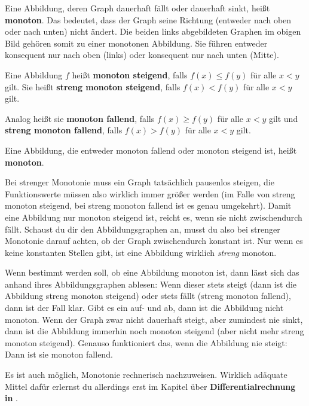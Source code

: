\documentclass[../../main.tex]{subfiles}
\begin{document}
Eine Abbildung, deren Graph dauerhaft fällt oder dauerhaft sinkt, heißt \textbf{monoton}. Das bedeutet, dass der Graph seine Richtung (entweder nach oben oder nach unten) nicht ändert. Die beiden links abgebildeten Graphen im obigen Bild gehören somit zu einer monotonen Abbildung. Sie führen entweder konsequent nur nach oben (links) oder konsequent nur nach unten (Mitte).

\begin{definition}
    Eine Abbildung $f$ heißt \textbf{monoton steigend}, falls $f(x)\leq f(y)$ für alle $x<y$ gilt. Sie heißt \textbf{streng monoton steigend}, falls $f(x)<f(y)$ für alle $x<y$ gilt.
    
    Analog heißt sie \textbf{monoton fallend}, falls $f(x)\geq f(y)$ für alle $x<y$ gilt und \textbf{streng monoton fallend}, falls $f(x)>f(y)$ für alle $x<y$ gilt.
    
    Eine Abbildung, die entweder monoton fallend oder monoton steigend ist, heißt \textbf{monoton}.
\end{definition}

Bei strenger Monotonie muss ein Graph tatsächlich pausenlos steigen, die Funktionswerte müssen also wirklich immer größer werden (im Falle von streng monoton steigend, bei streng monoton fallend ist es genau umgekehrt). Damit eine Abbildung nur monoton steigend ist, reicht es, wenn sie nicht zwischendurch fällt. Schaust du dir den Abbildungsgraphen an, musst du also bei strenger Monotonie darauf achten, ob der Graph zwischendurch konstant ist. Nur wenn es keine konstanten Stellen gibt, ist eine Abbildung wirklich \emph{streng} monoton.

Wenn bestimmt werden soll, ob eine Abbildung monoton ist, dann lässt sich das anhand ihres Abbildungsgraphen ablesen: Wenn dieser stets steigt (dann ist die Abbildung streng monoton steigend) oder stets fällt (streng monoton fallend), dann ist der Fall klar. Gibt es ein auf- und ab, dann ist die Abbildung nicht monoton. Wenn der Graph zwar nicht dauerhaft steigt, aber zumindest nie sinkt, dann ist die Abbildung immerhin noch monoton steigend (aber nicht mehr streng monoton steigend). Genauso funktioniert das, wenn die Abbildung nie steigt: Dann ist sie monoton fallend. 

Es ist auch möglich, Monotonie rechnerisch nachzuweisen. Wirklich adäquate Mittel dafür erlernst du allerdings erst im Kapitel über \textbf{Differentialrechnung in \Real}.
\end{document}
